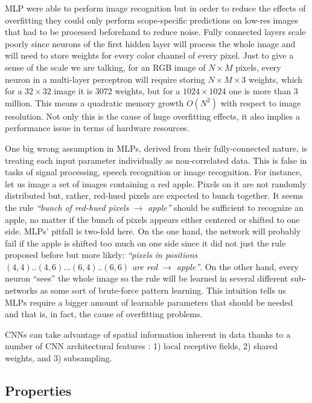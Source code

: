 MLP were able to perform image recognition \cite{Zhang1999} but in order to reduce the effects of overfitting they could only perform scope-specific predictions on low-res images that had to be processed beforehand to reduce noise.
Fully connected layers scale poorly since neurons of the first hidden layer will process the whole image and will need to store weights for every color channel of every pixel.
Just to give a sense of the scale we are talking, for an RGB image of ${N}\times{M}$ pixels, every neuron in a multi-layer perceptron will require storing ${N}\times{M}\times{3}$ weights, which for a ${32}\times{32}$ image it is $3072$ weights, but for a ${1024}\times{1024}$ one is more than $3$ million.
This means a quadratic memory growth $O(N^2)$ with respect to image resolution.
Not only this is the cause of huge overfitting effects, it also implies a performance issue in terms of hardware resources.

One big wrong assumption in MLPs, derived from their fully-connected nature, is treating each input parameter individually as non-correlated data.
This is false in tasks of signal processing, speech recognition or image recognition.
For instance, let us image a set of images containing a red apple.
Pixels on it are not randomly distributed but, rather, red-hued pixels are expected to bunch together.
It seems the rule \emph{``bunch of red-hued pixels $\rightarrow$ apple''} should be sufficient to recognize an apple, no matter if the bunch of pixels appears either centered or shifted to one side.
MLPs' pitfall is two-fold here.
On the one hand, the network will probably fail if the apple is shifted too much on one side since it did not just the rule proposed before but more likely: \emph{``pixels in positions $(4, 4)..(4, 6)...(6, 4)..(6, 6)$ are red $\rightarrow$ apple''}.
On the other hand, every neuron ``sees'' the whole image so the rule will be learned in several different sub-networks as some sort of brute-force pattern learning.
This intuition tells us MLPs require a bigger amount of learnable parameters that should be needed and that is, in fact, the cause of overfitting problems.

CNNs can take advantage of spatial information inherent in data thanks to a number of CNN architectural features \cite{LeCun1998}: 1) local receptive fields, 2) shared weights, and 3) subsampling.


\subsection{Properties}
\label{sub:concepts:convnets:properties}

